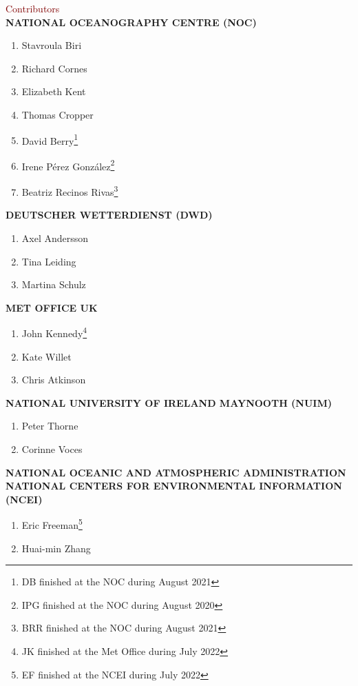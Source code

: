 \newpage

\begin{adjustwidth}{2.cm}{}
\vspace* {10mm}

{\fontsize{20}{24} \selectfont \textcolor{maroon}{Contributors}}\\

{\fontsize{14}{17} \selectfont \textbf{\uppercase{{National Oceanography Centre (NOC)}}}}
\begin{enumerate}
\item Stavroula Biri
\item Richard Cornes
\item Elizabeth Kent
\item Thomas Cropper
\item David Berry\footnote{DB finished at the NOC during August 2021}
\item Irene Pérez González\footnote{IPG finished at the NOC during August 2020}
\item Beatriz Recinos Rivas\footnote{BRR finished at the NOC during August 2021}
\end{enumerate}

{\fontsize{14}{17} \selectfont \textbf{\uppercase{Deutscher Wetterdienst (DWD)}}}
\begin{enumerate}
\item Axel Andersson
\item Tina Leiding
\item Martina Schulz
\end{enumerate}

{\fontsize{14}{17} \selectfont \textbf{\uppercase{{Met Office UK}}}}
\begin{enumerate}
\item John Kennedy\footnote{JK finished at the Met Office during July 2022}
\item Kate Willet
\item Chris Atkinson
\end{enumerate}

{\fontsize{14}{17} \selectfont \textbf{\uppercase{National University of Ireland Maynooth (NUIM)}}}
\begin{enumerate}
\item Peter Thorne
\item Corinne Voces
\end{enumerate}

{\fontsize{14}{17} \selectfont \textbf{\uppercase{National Oceanic and Atmospheric Administration National Centers for Environmental Information (NCEI)}}}
\begin{enumerate}
\item Eric Freeman\footnote{EF finished at the NCEI during July 2022}
\item Huai-min Zhang
\end{enumerate}

\end{adjustwidth}
